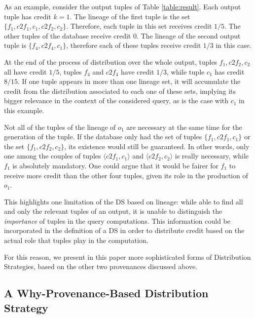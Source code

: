 As an example, consider the output tuples of Table \ref{table:result}.
Each output tuple has credit $k = 1$.
The lineage of the first tuple is the set $\{f_1, c2f_1, c_1, c2f_2, c_2\}$. Therefore, each tuple in this set receives credit $1/5$. The other tuples of the database receive credit 0.
The lineage of the second output tuple is $\{ f_4, c2f_4, c_1\}$, therefore each of these tuples receive credit $1/3$ in this case.

At the end of the process of distribution over the whole output, tuples $f_1, c2f_2, c_2$ all have credit $1/5$, tuples $f_4$ and $c2f_4$ have credit $1/3$, while tuple $c_1$ has credit $8/15$.  
If one tuple appears in more than one lineage set, it will accumulate the credit from the distribution associated to each one of these sets, implying its bigger relevance in the context of the considered query, as is the case with $c_1$ in this example.
 
Not all of the tuples of the lineage of $o_1$ are necessary at the same time for the generation of the tuple. 
If the database only had the set of  tuples $\{f_1, c2f_1, c_1\}$ or the set $\{f_1, c2f_2, c_2\}$, its existence would still be guaranteed. 
In other words, only one among the couples of tuples $\langle c2f_1, c_1 \rangle$ and $\langle c2f_2, c_2 \rangle$ is really necessary, while $f_1$ is absolutely mandatory. 
One could argue that it would be fairer for $f_1$ to receive more credit than the other four tuples, given its role in the production of $o_1$.  

This highlights one limitation of the DS based on lineage: while able to find all and only the relevant tuples of an output, it is unable to distinguish the \emph{importance} of tuples in the query computations. 
This information could be incorporated in the definition of a DS in order to distribute credit based on the actual role that tuples play in the computation. 

For this reason, we present in this paper more sophisticated forms of Distribution Strategies, based on the other two provenances discussed above.

\subsection{A Why-Provenance-Based Distribution Strategy}

